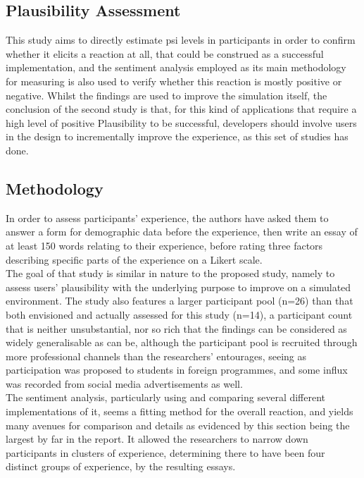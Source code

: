 \subsection{Plausibility Assessment}

This study aims to directly estimate \gls{psi} levels in participants in order to confirm whether it elicits a reaction at all, that could be construed as a successful implementation, and the sentiment analysis employed as its main methodology for measuring is also used to verify whether this reaction is mostly positive or negative. Whilst the findings are used to improve the simulation itself, the conclusion of the second study is that, for this kind of applications that require a high level of positive Plausibility to be successful, developers should involve users in the design to incrementally improve the experience, as this set of studies has done.

\subsection{Methodology}

In order to assess participants' experience, the authors have asked them to answer a form for demographic data before the experience, then write an essay of at least 150 words relating to their experience, before rating three factors describing specific parts of the experience on a Likert scale.\\

The goal of that study is similar in nature to the proposed study, namely to assess users' plausibility with the underlying purpose to improve on a simulated environment. The study also features a larger participant pool (n=26) than that both envisioned and actually assessed for this study (n=14), a participant count that is neither unsubstantial, nor so rich that the findings can be considered as widely generalisable as can be, although the participant pool is recruited through more professional channels than the researchers' entourages, seeing as participation was proposed to students in foreign programmes, and some influx was recorded from social media advertisements as well.\\

The sentiment analysis, particularly using and comparing several different implementations of it, seems a fitting method for the overall reaction, and yields many avenues for comparison and details as evidenced by this section being the largest by far in the report. It allowed the researchers to narrow down participants in clusters of experience, determining there to have been four distinct groups of experience, by the resulting essays.\\

